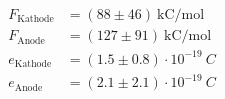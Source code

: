 \begin{align*}
F_\text{Kathode} &= (88 \pm 46)~\text{kC/mol}\\
F_\text{Anode} &= (127 \pm 91)~\text{kC/mol} \\
e_\text{Kathode} &= (1.5 \pm 0.8)\cdot 10^{-19}~C \\
e_\text{Anode} &= (2.1 \pm 2.1)\cdot 10^{-19}~C  
\end{align*}
